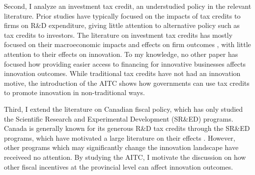 \documentclass[../main.tex]{subfiles}
\begin{document}
Second, I analyze an investment tax credit, an understudied policy in the relevant literature. Prior studies have typically focused on the impacts of tax credits to firms on R\&D expenditure, giving little attention to alternative policy such as tax credits to investors. The literature on investment tax credits has mostly focused on their macroeconomic impacts and effects on firm outcomes \parencite{pereira94, lyon89,slattery_zidar20}, with little attention to their effects on innovation. To my knowledge, no other paper has focused how providing easier access to financing for innovative businesses affects innovation outcomes. While traditional tax credits have not had an innovation motive, the introduction of the AITC shows how governments can use tax credits to promote innovation in non-traditional ways. 

Third, I extend the literature on Canadian fiscal policy, which has only studied the Scientific Research and Experimental Development (SR\&ED) programs. Canada is generally known for its generous R\&D tax credits through the SR\&ED programs, which have motivated a large literature on their effects \parencite{agrawal_etal20,czarnitzki_etal11,berube_mohnen09,mansfield_switzer85a,bernstein86b}. However, other programs which may significantly change the innovation landscape have receiveed no attention. By studying the AITC, I motivate the discussion on how other fiscal incentives at the provincial level can affect innovation outcomes. 
\end{document}

